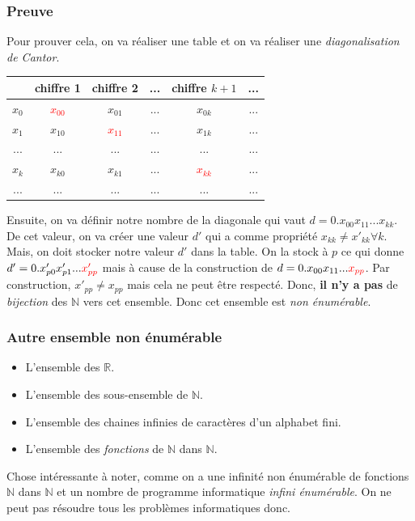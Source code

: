 \documentclass{report}
\begin{document}
\subsubsection{Preuve}
Pour prouver cela, on va réaliser une table et on va réaliser une \textit{diagonalisation de Cantor}.
\begin{center}
\begin{tabular}{|c||c|c|c|c|c|}
	\hline
	 & chiffre 1 & chiffre 2 & ... & chiffre $k+1$ & ...\\
	 \hline
	 $x_0$ & \textcolor{red}{$x_{00}$} & $x_{01}$ & ... & $x_{0k}$ & ...\\
	 \hline
	 $x_1$ & $x_{10}$ & \textcolor{red}{$x_{11}$} & ... & $x_{1k}$ & ...\\
	 \hline
	 ...& ... & ... & ... & ... & ...\\
	 \hline
	 $x_k$ & $x_{k0}$ & $x_{k1}$ & ... & \textcolor{red}{$x_{kk}$} & ...\\
	\hline
	 ...& ... & ... & ... & ... & ...\\
	\hline
\end{tabular}
\end{center}
Ensuite, on va définir notre nombre de la diagonale qui vaut $d = 0.x_{00}x_{11}...x_{kk}$. De cet valeur, on va créer une valeur $d'$ qui a comme propriété $x_{kk} \neq x'_{kk} \forall k$.\\
Mais, on doit stocker notre valeur $d'$ dans la table. On la stock à $p$ ce qui donne $d' = 0.x'_{p0}x'_{p1}... \textcolor{red}{x'_{pp}}$ mais à cause de la construction de $d = 0.x_{00}x_{11}...\textcolor{red}{x_{pp}}$. Par construction, $x'_{pp} \neq x_{pp}$ mais cela ne peut être respecté. Donc, \textbf{il n'y a pas} de \textit{bijection} des $\mathbb{N}$ vers cet ensemble. Donc cet ensemble est \textit{non énumérable}.

\subsubsection{Autre ensemble non énumérable}
\begin{itemize}
\item L'ensemble des $\mathbb{R}$.
\item L'ensemble des sous-ensemble de $\mathbb{N}$.
\item L'ensemble des chaines infinies de caractères d'un alphabet fini.
\item L'ensemble des \textit{fonctions} de $\mathbb{N}$ dans $\mathbb{N}$.
\end{itemize}
Chose intéressante à noter, comme on a une infinité non énumérable de fonctions $\mathbb{N}$ dans $\mathbb{N}$ et un nombre de programme informatique \textit{infini énumérable}. On ne peut pas résoudre tous les problèmes informatiques donc.
\end{document}
